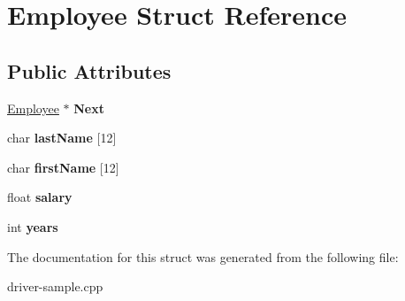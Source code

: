 \hypertarget{structEmployee}{\section{Employee Struct Reference}
\label{structEmployee}
}
\subsection*{Public Attributes}
\begin{DoxyCompactItemize}
\item 
\hypertarget{structEmployee_af6c7eba7cba5872a066f9f7313d79288}{\hyperlink{structEmployee}{Employee} $\ast$ {\bfseries Next}}\label{structEmployee_af6c7eba7cba5872a066f9f7313d79288}

\item 
\hypertarget{structEmployee_a2af257f82964374dd650a71e6d82c132}{char {\bfseries last\-Name} \mbox{[}12\mbox{]}}\label{structEmployee_a2af257f82964374dd650a71e6d82c132}

\item 
\hypertarget{structEmployee_a290ad2f5cde4ded898284e5c572b430d}{char {\bfseries first\-Name} \mbox{[}12\mbox{]}}\label{structEmployee_a290ad2f5cde4ded898284e5c572b430d}

\item 
\hypertarget{structEmployee_a0ad15a19af8e442ceeb212ca9fbc2d50}{float {\bfseries salary}}\label{structEmployee_a0ad15a19af8e442ceeb212ca9fbc2d50}

\item 
\hypertarget{structEmployee_a3e4862d9dfc73becb459a562fa2e25f5}{int {\bfseries years}}\label{structEmployee_a3e4862d9dfc73becb459a562fa2e25f5}

\end{DoxyCompactItemize}


The documentation for this struct was generated from the following file\-:\begin{DoxyCompactItemize}
\item 
driver-\/sample.\-cpp\end{DoxyCompactItemize}
